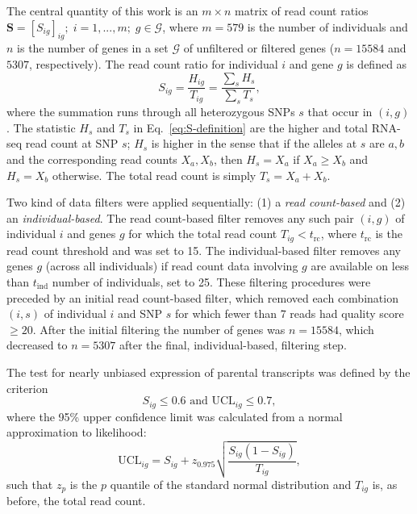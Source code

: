 \documentclass[letterpaper]{article}
\begin{document}
The central quantity of this work is an \(m\times n\) matrix of read count ratios
\(\mathbf{S} = [S_{ig}]_{ig};\; i=1,...,m; \; g\in\mathcal{G}\), where
\(m=579\) is the number of individuals and \(n\) is the number of genes
in a set \(\mathcal{G}\) of unfiltered or filtered genes (\(n=15584\) and \(5307\),
respectively).  The read count ratio for
individual \(i\) and gene \(g\) is defined as
\begin{equation}
S_{ig} = \frac{H_{ig}}{T_{ig}}= \frac{\sum_s H_s}{\sum_sT_s},
\label{eq:S-definition}
\end{equation}
where the summation runs through all heterozygous SNPs \(s\) that occur in
\((i,g)\).  The statistic \(H_s\) and \(T_s\) in Eq.~\ref{eq:S-definition} are
the higher and total RNA-seq read count at SNP \(s\); \(H_s\) is higher in the
sense that if the alleles at \(s\) are \(a,b\) and the corresponding read counts
\(X_a,X_b\), then \(H_s = X_a\) if \(X_a\ge X_b\) and \(H_s = X_b\) otherwise.
The total read count is simply \(T_s = X_a + X_b\).

Two kind of data filters were applied sequentially: (1) a \emph{read count-based}
and (2) an \emph{individual-based}.  The read count-based filter removes any
such pair $(i,g)$ of individual $i$ and genes $g$ for which the total read
count $T_{ig}<t_\mathrm{rc}$, where $t_\mathrm{rc}$ is the read count
threshold and was set to 15. The individual-based filter removes any genes $g$ (across all
individuals) if read count data involving $g$ are available on less than
$t_\mathrm{ind}$ number of individuals, set to 25.
These filtering procedures were preceded by an initial read count-based
filter, which removed each combination \((i,s)\) of individual \(i\) and SNP
\(s\) for which fewer than 7 reads had quality score \(\ge20\).  After the
initial filtering the number of genes was \(n=15584\), which decreased to
\(n=5307\) after the final, individual-based, filtering step.

The test for nearly unbiased expression of parental transcripts was defined by
the criterion
\begin{equation}
S_{ig} \le 0.6 \text{ and } \mathrm{UCL}_{ig} \le 0.7,
\label{eq:unbiased-test}
\end{equation}
where the 95\% upper confidence limit was calculated from a normal approximation to
likelihood:
\begin{equation}
\mathrm{UCL}_{ig} = S_{ig} + z_{0.975} \sqrt{\frac{S_{ig} (1 - S_{ig})}{T_{ig}}},
\end{equation}
such that $z_{p}$ is the $p$ quantile of the standard normal distribution and
$T_{ig}$ is, as before, the total read count.
\end{document}
